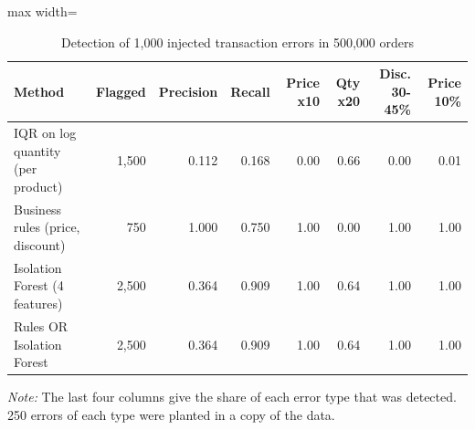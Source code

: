 \begin{table}[htbp]
\centering
\footnotesize
\caption{Detection of 1,000 injected transaction errors in 500,000 orders}
\label{tab:anomaly}
\begin{adjustbox}{max width=\linewidth}
\begin{tabular}{lrrrrrrr}
\toprule
\textbf{Method} & \textbf{Flagged} & \textbf{Precision} & \textbf{Recall} & \textbf{Price x10} & \textbf{Qty x20} & \textbf{Disc. 30-45\%} & \textbf{Price 10\%} \\
\midrule
IQR on log quantity (per product) & 1,500 & 0.112 & 0.168 & 0.00 & 0.66 & 0.00 & 0.01 \\
Business rules (price, discount) & 750 & 1.000 & 0.750 & 1.00 & 0.00 & 1.00 & 1.00 \\
Isolation Forest (4 features) & 2,500 & 0.364 & 0.909 & 1.00 & 0.64 & 1.00 & 1.00 \\
Rules OR Isolation Forest & 2,500 & 0.364 & 0.909 & 1.00 & 0.64 & 1.00 & 1.00 \\
\bottomrule
\end{tabular}
\end{adjustbox}
\par\smallskip\parbox{0.92\linewidth}{\footnotesize\emph{Note:} The last four columns give the share of each error type that was detected. 250 errors of each type were planted in a copy of the data.}
\end{table}